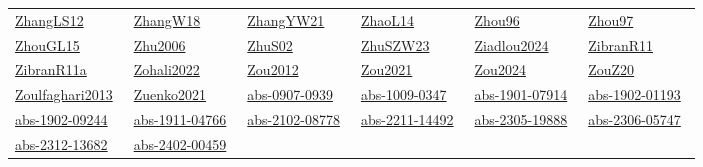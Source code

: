 \begin{longtable}{*{6}{l}}
\href{../scheduling/works/ZhangLS12.pdf}{ZhangLS12}~\cite{ZhangLS12} & \href{../scheduling/works/ZhangW18.pdf}{ZhangW18}~\cite{ZhangW18} & \href{../scheduling/works/ZhangYW21.pdf}{ZhangYW21}~\cite{ZhangYW21} & \href{../scheduling/works/ZhaoL14.pdf}{ZhaoL14}~\cite{ZhaoL14} & \href{../scheduling/works/Zhou96.pdf}{Zhou96}~\cite{Zhou96} & \href{../scheduling/works/Zhou97.pdf}{Zhou97}~\cite{Zhou97}\\ 
\href{../scheduling/works/ZhouGL15.pdf}{ZhouGL15}~\cite{ZhouGL15} & \href{../}{Zhu2006}~\cite{Zhu2006} & \href{../scheduling/works/ZhuS02.pdf}{ZhuS02}~\cite{ZhuS02} & \href{../scheduling/works/ZhuSZW23.pdf}{ZhuSZW23}~\cite{ZhuSZW23} & \href{../}{Ziadlou2024}~\cite{Ziadlou2024} & \href{../scheduling/works/ZibranR11.pdf}{ZibranR11}~\cite{ZibranR11}\\ 
\href{../scheduling/works/ZibranR11a.pdf}{ZibranR11a}~\cite{ZibranR11a} & \href{../}{Zohali2022}~\cite{Zohali2022} & \href{../scheduling/works/Zou2012.pdf}{Zou2012}~\cite{Zou2012} & \href{../scheduling/works/Zou2021.pdf}{Zou2021}~\cite{Zou2021} & \href{../}{Zou2024}~\cite{Zou2024} & \href{../scheduling/works/ZouZ20.pdf}{ZouZ20}~\cite{ZouZ20}\\ 
\href{../}{Zoulfaghari2013}~\cite{Zoulfaghari2013} & \href{../scheduling/works/Zuenko2021.pdf}{Zuenko2021}~\cite{Zuenko2021} & \href{../scheduling/works/abs-0907-0939.pdf}{abs-0907-0939}~\cite{abs-0907-0939} & \href{../scheduling/works/abs-1009-0347.pdf}{abs-1009-0347}~\cite{abs-1009-0347} & \href{../scheduling/works/abs-1901-07914.pdf}{abs-1901-07914}~\cite{abs-1901-07914} & \href{../scheduling/works/abs-1902-01193.pdf}{abs-1902-01193}~\cite{abs-1902-01193}\\ 
\href{../scheduling/works/abs-1902-09244.pdf}{abs-1902-09244}~\cite{abs-1902-09244} & \href{../scheduling/works/abs-1911-04766.pdf}{abs-1911-04766}~\cite{abs-1911-04766} & \href{../scheduling/works/abs-2102-08778.pdf}{abs-2102-08778}~\cite{abs-2102-08778} & \href{../scheduling/works/abs-2211-14492.pdf}{abs-2211-14492}~\cite{abs-2211-14492} & \href{../scheduling/works/abs-2305-19888.pdf}{abs-2305-19888}~\cite{abs-2305-19888} & \href{../scheduling/works/abs-2306-05747.pdf}{abs-2306-05747}~\cite{abs-2306-05747}\\ 
\href{../scheduling/works/abs-2312-13682.pdf}{abs-2312-13682}~\cite{abs-2312-13682} & \href{../scheduling/works/abs-2402-00459.pdf}{abs-2402-00459}~\cite{abs-2402-00459} & \end{longtable}
